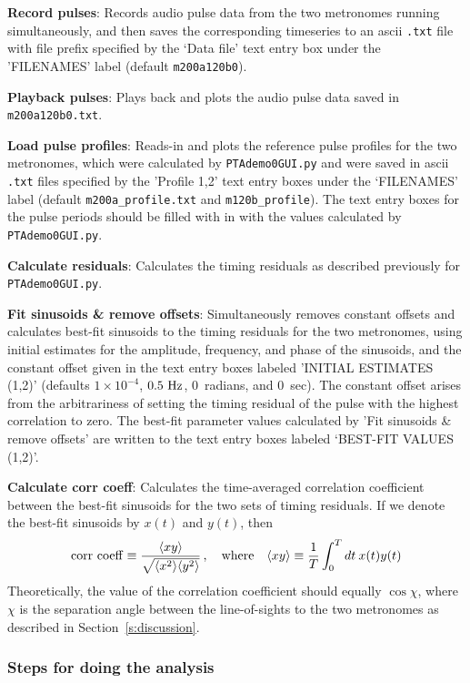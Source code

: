 \documentclass[10pt]{NSF}
\def\be{\begin{equation}}
\def\ee{\end{equation}}
\begin{document}
{\bf Record pulses}:
Records audio pulse data from the two metronomes running simultaneously, 
and then saves the corresponding timeseries to an ascii {\tt .txt} file 
with file prefix specified by the `Data file' text entry box under 
the 'FILENAMES' label (default {\tt m200a120b0}).

{\bf Playback pulses}:
Plays back and plots the audio pulse data saved in
{\tt m200a120b0.txt}.

{\bf Load pulse profiles}:
Reads-in and plots the reference pulse profiles for the two 
metronomes, which were calculated by {\tt PTAdemo0GUI.py} and
were saved in ascii {\tt .txt} files specified by 
the 'Profile 1,2' text entry boxes under the `FILENAMES' label
(default {\tt m200a\_profile.txt} and {\tt m120b\_profile}).
The text entry boxes for the pulse periods should be filled with 
in with the values calculated by {\tt PTAdemo0GUI.py}.

{\bf Calculate residuals}:
Calculates the timing residuals as described previously
for {\tt PTAdemo0GUI.py}.

{\bf Fit sinusoids \& remove offsets}:
Simultaneously removes constant offsets and calculates best-fit 
sinusoids to the timing residuals for the two metronomes, using 
initial estimates for the amplitude, frequency, and phase of
the sinusoids, and the constant offset given in the text entry boxes labeled 
'INITIAL ESTIMATES (1,2)' (defaults $1\times 10^{-4}$, $0.5~{\rm Hz}$,
0~radians, and 0~sec).
The constant offset arises from the arbitrariness of setting the 
timing residual of the pulse with the highest correlation to zero.
The best-fit parameter values calculated by 'Fit sinusoids \& remove offsets' 
are written to the text entry boxes labeled `BEST-FIT VALUES (1,2)'.

{\bf Calculate corr coeff}:
Calculates the time-averaged correlation coefficient between 
the best-fit sinusoids for the two sets of timing residuals.
If we denote the best-fit sinusoids by $x(t)$ and $y(t)$, then
%
\be
{\rm corr\ coeff}\equiv 
\frac{\langle xy\rangle}{\sqrt{\langle x^2\rangle \langle y^2\rangle}}
\,,
\quad{\rm where}\quad
\langle x y\rangle \equiv \frac{1}{T}\int_0^T dt\> x(t)y(t)
\ee
%
Theoretically, the value of the correlation coefficient 
should equally $\cos\chi$, where $\chi$ is the separation angle 
between the line-of-sights to the
two metronomes as described in Section~\ref{s:discussion}.

\subsubsection{Steps for doing the analysis}
\end{document}
